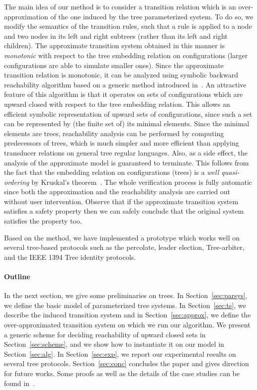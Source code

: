 The main idea of our method is to consider a transition relation
which is an over-approximation of the one induced by the tree parameterized system.
%
To do so, we modify the semantics of the transition rules, such that a rule is applied
to a node and two nodes in its left and right subtrees (rather than its
left and right children).
%
The approximate transition system obtained in this manner is \emph{monotonic}
with respect to the tree embedding relation on configurations (larger configurations
are able to simulate smaller ones).
%
Since the approximate transition relation is monotonic, it can be analyzed using
 symbolic backward reachability algorithm based on a generic method
introduced in~\cite{Parosh:Bengt:Karlis:Tsay:general}.
%
An attractive feature of this algorithm is that it operates
on sets of configurations which are upward closed with respect
to the tree embedding relation.
%
This allows an efficient symbolic representation of upward sets of configurations,
since such a set can be represented by (the finite set of) its minimal elements.
%
Since the minimal elements are trees, reachability analysis can be performed by computing
predecessors of trees, which is much simpler and more efficient
than applying transducer relations on general tree regular languages.
%
Also, as a side effect, the analysis of the approximate model is
guaranteed to terminate.
%
This follows from the fact that the embedding relation on configurations (trees)
is a \emph{well quasi-ordering} by Kruskal's theorem~\cite{kruskal}.
%
The whole verification process is fully automatic since both
the approximation and the reachability analysis are carried out
without user intervention.
%
Observe that if the approximate transition system satisfies a 
safety property then we can safely conclude that
the original system satisfies the property too.

Based on the method,
we have implemented a prototype  which 
works well on several tree-based protocols such as 
the percolate, leader election, Tree-arbiter, and the IEEE 1394 Tree identity protocols.
% 

\paragraph{\bf Outline}
%
In the next section, we give some preliminaries on trees.
%
In Section~\ref{sec:parsys}, we define the basic model of parameterized tree systems.
%
In Section~\ref{sec:ts}, we describe the induced transition system and in Section~\ref{sec:approx}, 
we define the over-approximated transition system on which we run our algorithm.
%
We present a generic scheme for deciding reachability of upward closed sets in Section~\ref{sec:scheme}, 
and we show how to instantiate it on our model in Section~\ref{sec:alg}.
%
In Section~\ref{sec:exp}, we report our experimental results on several tree protocols.
%
Section~\ref{sec:conc} concludes the paper and gives direction for future works.
%
Some proofs as well as the details of the case studies can be found in~\cite{it:2008-010}.
%

